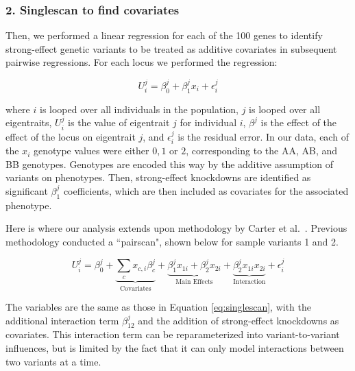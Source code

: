 \documentclass[letterpaper, 12pt]{article}
\begin{document}

\subsubsection*{2. Singlescan to find covariates}

Then, we performed a linear regression for each of the 100 genes to identify strong-effect genetic variants to be treated as additive covariates in subsequent pairwise regressions. For each locus we performed the regression: 

\begin{equation} \label{eq:singlescan}
U^{j}_{i} = \beta^{j}_{0} + \beta^{j}_{1}x_i + \epsilon^{j}_{i}
\end{equation}

where $i$ is looped over all individuals in the population, $j$ is looped over all eigentraits, $U^{j}_{i}$ is the value of eigentrait $j$ for individual $i$, $\beta^{j}$ is the effect of the effect of the locus on eigentrait $j$, and $\epsilon^{j}_{i}$ is the residual error. In our data, each of the $x_{i}$ genotype values were either $0, 1$ or $2$, corresponding to the AA, AB, and BB genotypes. Genotypes are encoded this way by the additive assumption of variants on phenotypes. Then, strong-effect knockdowns are identified as significant $\beta^{j}_{1}$ coefficients, which are then included as covariates for the associated phenotype. 

Here is where our analysis extends upon methodology by Carter et al.\ \cite{carter2013fly,carter2012yeast}. Previous methodology conducted a ``pairscan", shown below for sample variants 1 and 2.

\begin{equation}
U^{j}_{i} = \beta^{j}_{0} + \underbrace{\sum_{c}x_{c,i}\beta_{c}^j}_{\text{Covariates}} +  \underbrace{\beta^{j}_{1}x_{1i} + \beta^{j}_{2}x_{2i}}_{\text{Main Effects}} + \underbrace{\beta^{j}_{2}x_{1i}x_{2i}}_{\text{Interaction}} + \epsilon^{j}_{i}
\end{equation}

The variables are the same as those in Equation \ref{eq:singlescan}, with the additional interaction term $\beta_{12}^j$ and the addition of strong-effect knockdowns as covariates. This interaction term can be reparameterized into variant-to-variant influences, but is limited by the fact that it can only model interactions between two variants at a time. 
\end{document}
